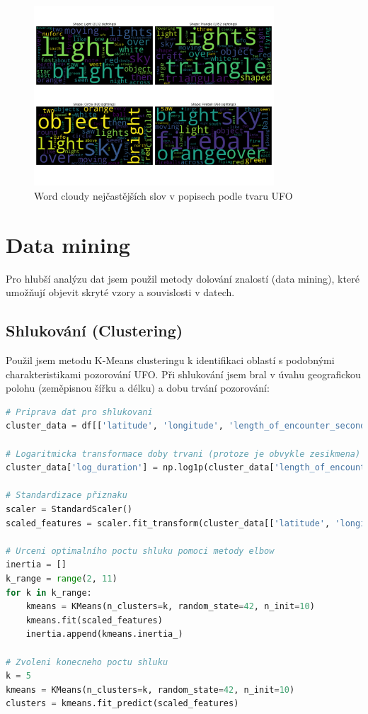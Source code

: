 \documentclass[a4paper,12pt]{article}
\begin{document}
\begin{figure}[h]
\centering
\includegraphics[width=0.8\textwidth]{../images/ufo_shape_wordclouds.png}
\caption{Word cloudy nejčastějších slov v popisech podle tvaru UFO}
\end{figure}

\section{Data mining}
Pro hlubší analýzu dat jsem použil metody dolování znalostí (data mining), které umožňují objevit skryté vzory a souvislosti v datech.

\subsection{Shlukování (Clustering)}
Použil jsem metodu K-Means clusteringu k identifikaci oblastí s podobnými charakteristikami pozorování UFO. Při shlukování jsem bral v úvahu geografickou polohu (zeměpisnou šířku a délku) a dobu trvání pozorování:

\begin{lstlisting}[language=python, caption=Implementace K-means shlukování]
# Priprava dat pro shlukovani
cluster_data = df[['latitude', 'longitude', 'length_of_encounter_seconds']].copy()

# Logaritmicka transformace doby trvani (protoze je obvykle zesikmena)
cluster_data['log_duration'] = np.log1p(cluster_data['length_of_encounter_seconds'])

# Standardizace přiznaku
scaler = StandardScaler()
scaled_features = scaler.fit_transform(cluster_data[['latitude', 'longitude', 'log_duration']])

# Urceni optimalního poctu shluku pomoci metody elbow
inertia = []
k_range = range(2, 11)
for k in k_range:
    kmeans = KMeans(n_clusters=k, random_state=42, n_init=10)
    kmeans.fit(scaled_features)
    inertia.append(kmeans.inertia_)

# Zvoleni konecneho poctu shluku
k = 5 
kmeans = KMeans(n_clusters=k, random_state=42, n_init=10)
clusters = kmeans.fit_predict(scaled_features)
\end{lstlisting}
\end{document}
